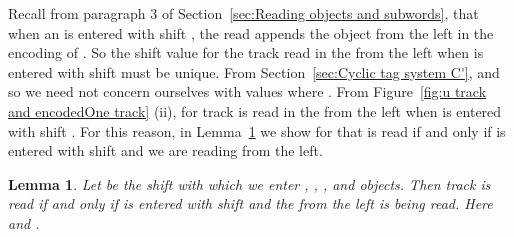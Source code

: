 \documentclass[11pt]{article} \usepackage{amsfonts,amsmath,amssymb,amsthm}
\newtheorem{lemma}{Lemma}
\begin{document}
Recall from paragraph 3 of Section~\ref{sec:Reading objects and  subwords}, that when an  is entered with shift , the   read appends the  object from the left in the encoding of . 
So the shift value for the track read in the   from the left when  is entered with shift  must be unique.
From Section~\ref{sec:Cyclic tag system C'},  and so we need not concern ourselves with values where . 
From Figure~\ref{fig:u track and encodedOne track} (ii), for  track  is read in the   from the left when  is entered with shift . 
For this reason, in Lemma~\ref{lem: ui words with unique shift values} we show for  that  is read if and only if  is entered with shift  and we are reading   from the left.

\begin{lemma}\label{lem: ui words with unique shift values}
Let  be the shift with which we enter , , , and  objects. Then track  is read if and only if  is entered with shift  and the   from the left is being read. Here  and .
\end{lemma}
\end{document}
